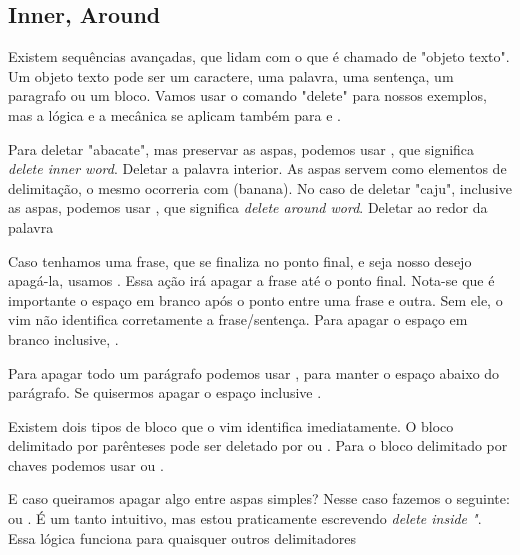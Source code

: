 \subsection{Inner, Around}
Existem sequências avançadas, que lidam com o que é chamado de "objeto texto".
Um objeto texto pode ser um caractere, uma palavra, uma sentença, um paragrafo ou um bloco.
Vamos usar o comando "delete" para nossos exemplos, mas a lógica e a mecânica se aplicam também
para  e .

Para deletar "abacate", mas preservar as aspas, podemos usar ,
que significa \textit{delete inner word}. Deletar a palavra interior.
As aspas servem como elementos de delimitação, o mesmo ocorreria com (banana).
No caso de deletar "caju", inclusive as aspas, podemos usar ,
que significa \textit{delete around word}. Deletar ao redor da palavra

Caso tenhamos uma frase, que se finaliza no ponto final,
e seja nosso desejo apagá-la, usamos .
Essa ação irá apagar a frase até o ponto final.
Nota-se que é importante o espaço em branco após o ponto entre uma frase e outra.
Sem ele, o vim não identifica corretamente a frase/sentença.
Para apagar o espaço em branco inclusive, . 

Para apagar todo um parágrafo podemos usar ,
para manter o espaço abaixo do parágrafo.
Se quisermos apagar o espaço inclusive .

Existem dois tipos de bloco que o vim identifica imediatamente.
O bloco delimitado por parênteses pode ser deletado por  ou .
Para o bloco delimitado por chaves podemos usar  ou .

E caso queiramos apagar algo entre aspas simples? Nesse caso fazemos o seguinte:
 ou .
É um tanto intuitivo, mas estou praticamente escrevendo \textit{delete inside "}.
Essa lógica funciona para quaisquer outros delimitadores

